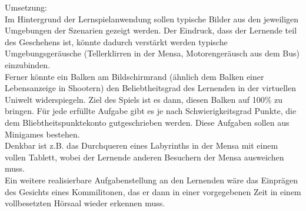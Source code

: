 \documentclass[a4paper,10pt]{article}
\begin{document}
Umsetzung:\\
Im Hintergrund der Lernspielanwendung sollen typische Bilder aus den jeweiligen Umgebungen der Szenarien gezeigt werden. Der Eindruck, dass der Lernende teil des Geschehens ist, könnte dadurch verstärkt werden typische Umgebungsgeräusche (Tellerklirren in der Mensa, Motorengeräusch aus dem Bus) einzubinden.\\
Ferner könnte ein Balken am Bildschirmrand (ähnlich dem Balken einer Lebensanzeige in Shootern) den Beliebtheitsgrad des Lernenden in der virtuellen Uniwelt widerspiegeln. Ziel des Spiels ist es dann, diesen Balken auf 100\% zu bringen. Für jede erfüllte Aufgabe gibt es je nach Schwierigkeitsgrad Punkte, die dem Bliebtheitspunktekonto gutgeschrieben werden.
Diese Aufgaben sollen aus Minigames bestehen.\\
Denkbar ist z.B. das Durchqueren eines Labyrinths in der Mensa mit einem vollen Tablett, wobei der Lernende anderen Besuchern der Mensa ausweichen muss.\\
Ein weitere realisierbare Aufgabenstellung an den Lernenden wäre das Einprägen des Gesichts eines Kommilitonen, das er dann in einer vorgegebenen Zeit in einem vollbesetzten Hörsaal wieder erkennen muss.
\end{document}

